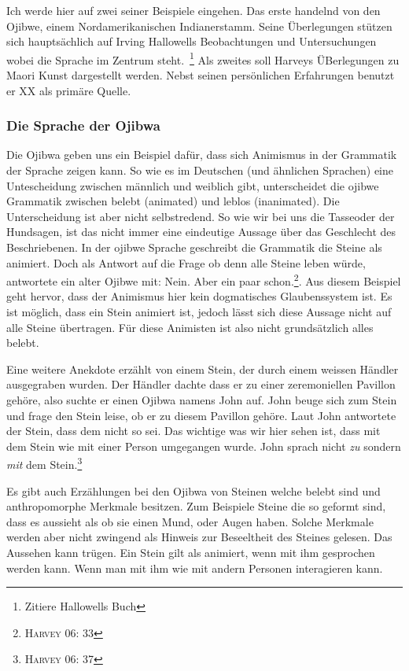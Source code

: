 Ich werde hier auf zwei seiner Beispiele eingehen. Das erste handelnd von den Ojibwe, einem Nordamerikanischen Indianerstamm. Seine Überlegungen stützen sich hauptsächlich auf Irving Hallowells Beobachtungen und Untersuchungen wobei die Sprache im Zentrum steht.~\footnote{Zitiere Hallowells Buch} Als zweites soll Harveys ÜBerlegungen zu Maori Kunst dargestellt werden. Nebst seinen persönlichen Erfahrungen benutzt er XX als primäre Quelle.

\subsubsection*{Die Sprache der Ojibwa}
Die Ojibwa geben uns ein Beispiel dafür, dass sich Animismus in der Grammatik der Sprache zeigen kann. So wie es im Deutschen (und ähnlichen Sprachen) eine Untescheidung zwischen männlich und weiblich gibt, unterscheidet die ojibwe Grammatik zwischen belebt (animated) und leblos (inanimated). Die Unterscheidung ist aber nicht selbstredend. So wie wir bei uns \glqq die Tasse\grqq oder \glqq der Hund\grqq sagen, ist das nicht immer eine eindeutige Aussage über das Geschlecht des Beschriebenen. In der ojibwe Sprache geschreibt die Grammatik die Steine als animiert. Doch als Antwort auf die Frage ob denn alle Steine leben würde, antwortete ein alter Ojibwe mit: \glqq Nein. Aber ein paar schon.\grqq\footnote{\textsc{Harvey 06: 33}}. Aus diesem Beispiel geht hervor, dass der Animismus hier kein dogmatisches Glaubenssystem ist. Es ist möglich, dass ein Stein animiert ist, jedoch lässt sich diese Aussage nicht auf alle Steine übertragen. Für diese Animisten ist also nicht grundsätzlich alles belebt.

Eine weitere Anekdote erzählt von einem Stein, der durch einem weissen Händler ausgegraben wurden. Der Händler dachte dass er zu einer zeremoniellen Pavillon gehöre, also suchte er einen Ojibwa namens John auf. John beuge sich zum Stein und frage den Stein leise, ob er zu diesem Pavillon gehöre. Laut John antwortete der Stein, dass dem nicht so sei. Das wichtige was wir hier sehen ist, dass mit dem Stein wie mit einer Person umgegangen wurde. John sprach nicht \emph{zu} sondern \emph{mit} dem Stein.\footnote{\textsc{Harvey 06: 37}} 

Es gibt auch Erzählungen bei den Ojibwa von Steinen welche belebt sind und anthropomorphe Merkmale besitzen. Zum Beispiele Steine die so geformt sind, dass es aussieht als ob sie einen Mund, oder Augen haben. Solche Merkmale werden aber nicht zwingend als Hinweis zur Beseeltheit des Steines gelesen. Das Aussehen kann trügen. Ein Stein gilt als animiert, wenn mit ihm gesprochen werden kann. Wenn man mit ihm wie mit andern Personen interagieren kann.

